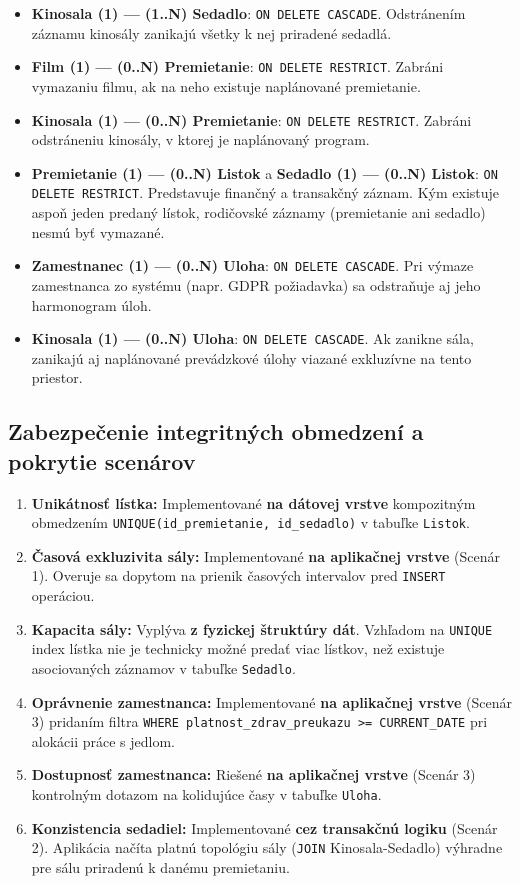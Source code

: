 \documentclass[11pt, a4paper]{article}
\begin{document}
\begin{itemize}
    \item \textbf{Kinosala (1) --- (1..N) Sedadlo}: \texttt{ON DELETE CASCADE}. Odstránením záznamu kinosály zanikajú všetky k nej priradené sedadlá.
    \item \textbf{Film (1) --- (0..N) Premietanie}: \texttt{ON DELETE RESTRICT}. Zabráni vymazaniu filmu, ak na neho existuje naplánované premietanie.
    \item \textbf{Kinosala (1) --- (0..N) Premietanie}: \texttt{ON DELETE RESTRICT}. Zabráni odstráneniu kinosály, v ktorej je naplánovaný program.
    \item \textbf{Premietanie (1) --- (0..N) Listok} a \textbf{Sedadlo (1) --- (0..N) Listok}: \texttt{ON DELETE RESTRICT}. Predstavuje finančný a transakčný záznam. Kým existuje aspoň jeden predaný lístok, rodičovské záznamy (premietanie ani sedadlo) nesmú byť vymazané.
    \item \textbf{Zamestnanec (1) --- (0..N) Uloha}: \texttt{ON DELETE CASCADE}. Pri výmaze zamestnanca zo systému (napr. GDPR požiadavka) sa odstraňuje aj jeho harmonogram úloh.
    \item \textbf{Kinosala (1) --- (0..N) Uloha}: \texttt{ON DELETE CASCADE}. Ak zanikne sála, zanikajú aj naplánované prevádzkové úlohy viazané exkluzívne na tento priestor.
\end{itemize}

\subsection{Zabezpečenie integritných obmedzení a pokrytie scenárov}
\begin{enumerate}
    \item \textbf{Unikátnosť lístka:} Implementované \textbf{na dátovej vrstve} kompozitným obmedzením \texttt{UNIQUE(id\_premietanie, id\_sedadlo)} v tabuľke \texttt{Listok}.
    \item \textbf{Časová exkluzivita sály:} Implementované \textbf{na aplikačnej vrstve} (Scenár 1). Overuje sa dopytom na prienik časových intervalov pred \texttt{INSERT} operáciou.
    \item \textbf{Kapacita sály:} Vyplýva \textbf{z fyzickej štruktúry dát}. Vzhľadom na \texttt{UNIQUE} index lístka nie je technicky možné predať viac lístkov, než existuje asociovaných záznamov v tabuľke \texttt{Sedadlo}.
    \item \textbf{Oprávnenie zamestnanca:} Implementované \textbf{na aplikačnej vrstve} (Scenár 3) pridaním filtra \texttt{WHERE platnost\_zdrav\_preukazu >= CURRENT\_DATE} pri alokácii práce s jedlom.
    \item \textbf{Dostupnosť zamestnanca:} Riešené \textbf{na aplikačnej vrstve} (Scenár 3) kontrolným dotazom na kolidujúce časy v tabuľke \texttt{Uloha}.
    \item \textbf{Konzistencia sedadiel:} Implementované \textbf{cez transakčnú logiku} (Scenár 2). Aplikácia načíta platnú topológiu sály (\texttt{JOIN} Kinosala-Sedadlo) výhradne pre sálu priradenú k danému premietaniu.
\end{enumerate}
\end{document}
